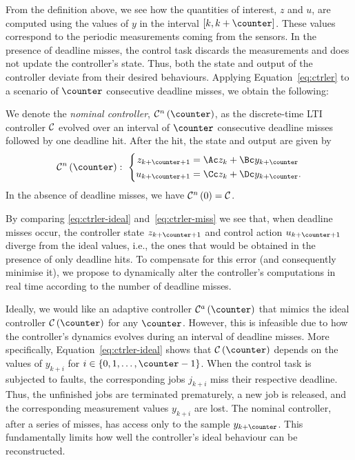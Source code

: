 From the definition above, we see how the quantities of interest, $z$ and $u$, are computed using the values of $y$ in the interval $\left[ k, k+\counter \right]$. 
These values correspond to the periodic measurements coming from the sensors.
%
In the presence of deadline misses, the control task discards the measurements and does not update the controller's state.
Thus, both the state and output of the controller deviate from their desired behaviours. 
Applying Equation~\eqref{eq:ctrler} to a scenario of $\counter$ consecutive deadline misses, we obtain the following:

\begin{definition}%
    We denote the \emph{nominal controller}, $\ctrler^n\funof{\counter}$, as the discrete-time LTI controller $\mathcal{C}$ evolved over an interval of $\counter$ consecutive deadline misses followed by one deadline hit. 
    After the hit, the state and output are given by
    \begin{equation}
        \label{eq:ctrler-miss}
        \ctrler^n\funof{\counter}:\,\, 
        \left\{\begin{aligned}
            z_{k+\counter+1} &= \Ac z_{k} + \Bc y_{k+\counter}\\
            u_{k+\counter+1} &= \Cc z_{k} + \Dc y_{k+\counter}.
        \end{aligned}\right.
    \end{equation}
    In the absence of deadline misses, we have $\mathcal{C}^n\left( 0 \right) = \mathcal{C}$.
\end{definition}

By comparing \eqref{eq:ctrler-ideal} and~\eqref{eq:ctrler-miss} we see that, when deadline misses occur, the controller state $z_{k+\counter+1}$ and control action $u_{k+\counter+1}$ diverge from the ideal values, i.e., the ones that would be obtained in the presence of only deadline hits. 
To compensate for this error (and consequently minimise it), we propose to
dynamically alter the controller's computations in real time according to the number of deadline misses. 

Ideally, we would like an adaptive controller $\ctrler^a\funof{\counter}$ that mimics the ideal controller $\ctrler\funof{\counter}$ for any $\counter$.
However, this is infeasible due to how the controller's dynamics evolves during an interval of deadline misses.
More specifically, Equation~\eqref{eq:ctrler-ideal} shows that $\ctrler\funof{\counter}$ depends on the values of $y_{k+i}$ for $i \in \left\{ 0, 1, \ldots, \counter-1 \right\}$.
When the control task is subjected to faults, the corresponding jobs $j_{k+i}$ miss their respective deadline. 
Thus, the unfinished jobs are terminated prematurely, a new job is released, and the corresponding measurement values $y_{k+i}$ are lost.
The nominal controller, after a series of misses, has access only to the sample $y_{k+\counter}$.
This fundamentally limits how well the controller's ideal behaviour can be reconstructed.

